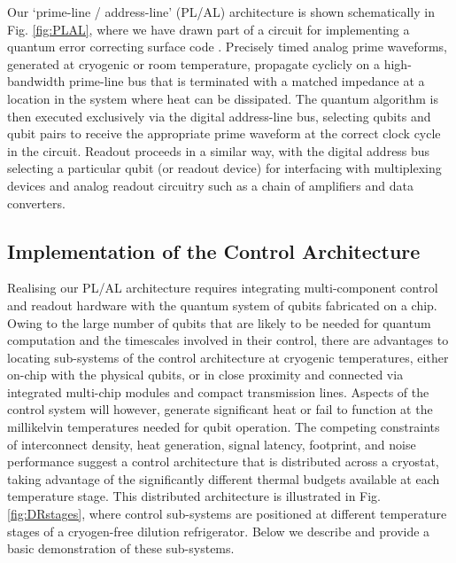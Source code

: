 Our `prime-line / address-line' (PL/AL) architecture is shown schematically in Fig. \ref{fig:PLAL}, where we have drawn part of a circuit for implementing a quantum error correcting surface code \cite{1998quant.ph.11052B,PhysRevLett.98.190504}. Precisely timed analog prime waveforms, generated at cryogenic or room temperature, propagate cyclicly on a high-bandwidth prime-line bus that is terminated with a matched impedance at a location in the system where heat can be dissipated.  The quantum algorithm is then executed exclusively via the digital address-line bus, selecting qubits and qubit pairs to receive the appropriate prime waveform at the correct clock cycle in the circuit. Readout proceeds in a similar way, with the digital address bus selecting a particular qubit (or readout device) for interfacing with multiplexing devices \cite{doi:10.1063/1.4739454,doi:10.1063/1.4868107} and analog readout circuitry such as a chain of amplifiers and data converters.

\subsection{Implementation of the Control Architecture}
Realising our PL/AL architecture requires integrating multi-component control and readout hardware with the quantum system of qubits fabricated on a chip. Owing to the large number of qubits that are likely to be needed for quantum computation and the timescales involved in their control, there are advantages to locating sub-systems of the control architecture at cryogenic temperatures, either on-chip with the physical qubits, or in close proximity and connected via integrated multi-chip modules \cite{783703} and compact transmission lines. Aspects of the control system will however, generate significant heat or fail to function at the millikelvin temperatures needed for qubit operation. The competing constraints of interconnect density, heat generation, signal latency, footprint, and noise performance suggest a control architecture that is distributed across a cryostat, taking advantage of the significantly different thermal budgets available at each temperature stage. This distributed architecture is illustrated in Fig. \ref{fig:DRstages}, where control sub-systems are positioned at different temperature stages of a cryogen-free dilution refrigerator. Below we describe and provide a basic demonstration of these sub-systems.

